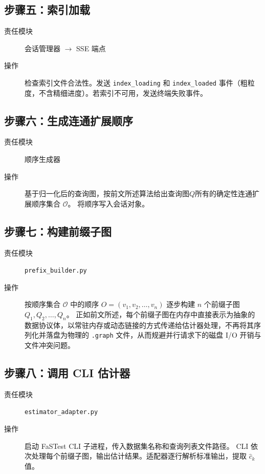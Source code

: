 \documentclass[12pt,a4paper]{article}
\begin{document}
\subsection{步骤五：索引加载}
\begin{description}
  \item[责任模块] 会话管理器 $\to$ SSE 端点
  \item[操作] 检查索引文件合法性。发送 \texttt{index\_loading} 和 \texttt{index\_loaded}
        事件（粗粒度，不含精细进度）。若索引不可用，发送终端失败事件。
\end{description}

\subsection{步骤六：生成连通扩展顺序}
\begin{description}
  \item[责任模块] 顺序生成器
  \item[操作] 基于归一化后的查询图，按前文所述算法给出查询图$Q$所有的确定性连通扩展顺序集合 $\mathcal{O}$。
        将顺序写入会话对象。
\end{description}

\subsection{步骤七：构建前缀子图}
\begin{description}
  \item[责任模块] \texttt{prefix\_builder.py}
  \item[操作] 按顺序集合 $\mathcal{O}$ 中的顺序 $O = (v_1, v_2, \dots, v_n)$ 逐步构建 $n$ 个前缀子图 $Q_1, Q_2, \dots, Q_n$。
        正如前文所述，每个前缀子图在内存中直接表示为抽象的数据协议体，以常驻内存或动态链接的方式传递给估计器处理，不再将其序列化并落盘为物理的 \texttt{.graph} 文件，从而规避并行请求下的磁盘 I/O 开销与文件冲突问题。
\end{description}

\subsection{步骤八：调用 CLI 估计器}
\begin{description}
  \item[责任模块] \texttt{estimator\_adapter.py}
  \item[操作] 启动 FaSTest CLI 子进程，传入数据集名称和查询列表文件路径。
        CLI 依次处理每个前缀子图，输出估计结果。适配器逐行解析标准输出，提取
        $\hat{c}_k$ 值。
\end{description}
\end{document}
